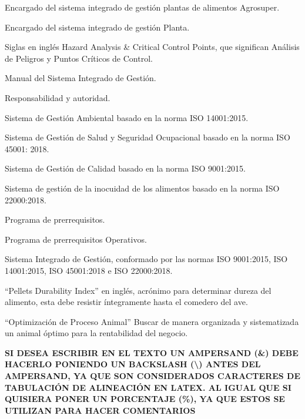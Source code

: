 \begin{description}[labelwidth=1.3cm, leftmargin=1.5cm]
\item[ESIG:] Encargado del sistema integrado de gestión plantas de alimentos Agrosuper.
\item[EPS:] Encargado del sistema integrado de gestión Planta.
\item[HACCP:] Siglas en inglés Hazard Analysis \& Critical Control Points, que significan Análisis de Peligros y Puntos Críticos de Control.
\item[MSIG:] Manual del Sistema Integrado de Gestión.
\item[R\&A:] Responsabilidad y autoridad.
\item[SGA:] Sistema de Gestión Ambiental basado en la norma ISO 14001:2015.
\item[SGS:] Sistema de Gestión de Salud y Seguridad Ocupacional basado en la norma ISO 
 45001: 2018.
\item[SGC:] Sistema de Gestión de Calidad basado en la norma ISO 9001:2015.
\item[SGIA:] Sistema de gestión de la inocuidad de los alimentos basado en la norma ISO 
 22000:2018.
\item[PPR] Programa de prerrequisitos.
\item[PPRO:] Programa de prerrequisitos Operativos.
\item[SIG:] Sistema Integrado de Gestión, conformado por las normas ISO 9001:2015, ISO 
 14001:2015, ISO 45001:2018 e ISO 22000:2018.
\item[PDI:] “Pellets Durability Index” en inglés, acrónimo para determinar dureza del alimento, esta debe resistir íntegramente hasta el comedero del ave. 
\item[OPA:] “Optimización de Proceso Animal” Buscar de manera organizada y sistematizada 
 un animal óptimo para la rentabilidad del negocio.
\end{description}

\textbf{SI DESEA ESCRIBIR EN EL TEXTO UN AMPERSAND (\&) DEBE HACERLO PONIENDO UN BACKSLASH (\textbackslash) ANTES DEL AMPERSAND, YA QUE SON CONSIDERADOS CARACTERES DE TABULACIÓN DE ALINEACIÓN EN LATEX. AL IGUAL QUE SI QUISIERA PONER UN PORCENTAJE (\%), YA QUE ESTOS SE UTILIZAN PARA HACER COMENTARIOS}